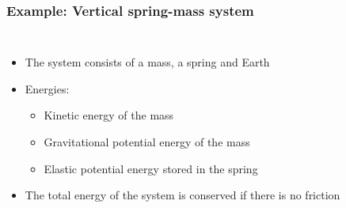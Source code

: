 \documentclass[12pt,compress,aspectratio=169]{beamer}
\begin{document}
\begin{frame}
  \frametitle{Example: Vertical spring-mass system}

  \begin{columns}
    \begin{itemize}
    \item The system consists of a mass, a spring and Earth
    \item Energies:
      \begin{itemize}
      \item Kinetic energy of the mass
      \item Gravitational potential energy of the mass
      \item Elastic potential energy stored in the spring
      \end{itemize}
    \item The total energy of the system is conserved if there is no friction
    \end{itemize}
  \end{columns}
\end{frame}
\end{document}
